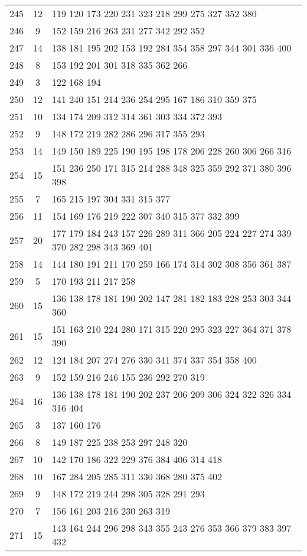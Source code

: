 \documentclass{standalone}
\begin{document}
\begin{tabular}{c c l}
245 & 12 & 119 120 173 220 231 323 218 299 275 327 352 380 \\
246 & 9 & 152 159 216 263 231 277 342 292 352 \\
247 & 14 & 138 181 195 202 153 192 284 354 358 297 344 301 336 400 \\
248 & 8 & 153 192 201 301 318 335 362 266 \\
249 & 3 & 122 168 194 \\
250 & 12 & 141 240 151 214 236 254 295 167 186 310 359 375 \\
251 & 10 & 134 174 209 312 314 361 303 334 372 393 \\
252 & 9 & 148 172 219 282 286 296 317 355 293 \\
253 & 14 & 149 150 189 225 190 195 198 178 206 228 260 306 266 316 \\
254 & 15 & 151 236 250 171 315 214 288 348 325 359 292 371 380 396 398 \\
255 & 7 & 165 215 197 304 331 315 377 \\
256 & 11 & 154 169 176 219 222 307 340 315 377 332 399 \\
257 & 20 & 177 179 184 243 157 226 289 311 366 205 224 227 274 339 370 282 298 343 369 401 \\
258 & 14 & 144 180 191 211 170 259 166 174 314 302 308 356 361 387 \\
259 & 5 & 170 193 211 217 258 \\
260 & 15 & 136 138 178 181 190 202 147 281 182 183 228 253 303 344 360 \\
261 & 15 & 151 163 210 224 280 171 315 220 295 323 227 364 371 378 390 \\
262 & 12 & 124 184 207 274 276 330 341 374 337 354 358 400 \\
263 & 9 & 152 159 216 246 155 236 292 270 319 \\
264 & 16 & 136 138 178 181 190 202 237 206 209 306 324 322 326 334 316 404 \\
265 & 3 & 137 160 176 \\
266 & 8 & 149 187 225 238 253 297 248 320 \\
267 & 10 & 142 170 186 322 229 376 384 406 314 418 \\
268 & 10 & 167 284 205 285 311 330 368 280 375 402 \\
269 & 9 & 148 172 219 244 298 305 328 291 293 \\
270 & 7 & 156 161 203 216 230 263 319 \\
271 & 15 & 143 164 244 296 298 343 355 243 276 353 366 379 383 397 432 \\

\end{tabular}
\end{document}
